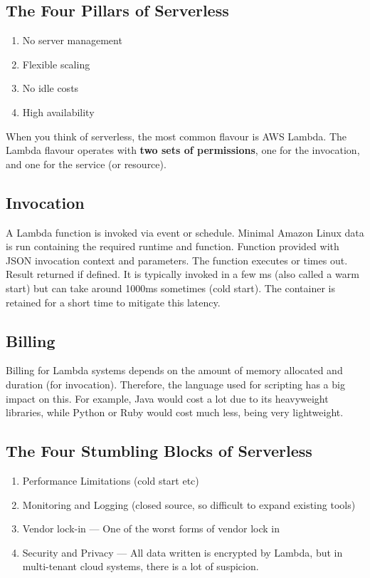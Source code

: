 \documentclass[11pt,a4paper,titlepage,dvipsnames,cmyk]{scrartcl}
\begin{document}
\subsection{The Four Pillars of Serverless}
\begin{enumerate}
\item No server management
\item Flexible scaling
\item No idle costs
\item High availability
\end{enumerate}

When you think of serverless, the most common flavour is AWS Lambda. The Lambda flavour operates with \textbf{two sets of permissions}, one for the invocation, and one for the service (or resource).

\subsection{Invocation}
A Lambda function is invoked via event or schedule. Minimal Amazon Linux data is run containing the required runtime and function. Function provided with JSON invocation context and parameters. The function executes or times out. Result returned if defined. It is typically invoked in a few ms (also called a warm start) but can take around 1000ms sometimes (cold start). The container is retained for a short time to mitigate this latency.

\subsection{Billing}
Billing for Lambda systems depends on the amount of memory allocated and duration (for invocation). Therefore, the language used for scripting has a big impact on this. For example, Java would cost a lot due to its heavyweight libraries, while Python or Ruby would cost much less, being very lightweight.

\subsection{The Four Stumbling Blocks of Serverless}
\begin{enumerate}
\item Performance Limitations (cold start etc)
\item Monitoring and Logging (closed source, so difficult to expand existing tools)
\item Vendor lock-in --- One of the worst forms of vendor lock in
\item Security and Privacy --- All data written is encrypted by Lambda, but in multi-tenant cloud systems, there is a lot of suspicion.
\end{enumerate}
\end{document}
